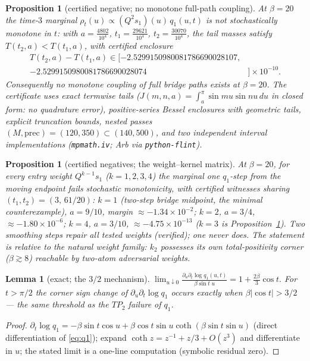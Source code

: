 \documentclass[11pt]{article}
\newtheorem{lemma}[theorem]{Lemma}
\newtheorem{proposition}[theorem]{Proposition}
\theoremstyle{remark}
\newcommand{\dd}{\,d}
\begin{document}
\begin{proposition}[certified negative; no monotone full-path coupling]
\label{prop:coupling}
At $\beta=20$ the time-$3$ marginal
$\rho_t(u)\propto(Q^2s_1)(u)\,q_1(u,t)$ is not stochastically monotone in
$t$: with $a=\tfrac{4802}{10^4}$, $t_1=\tfrac{29621}{10^4}$,
$t_2=\tfrac{30070}{10^4}$, the tail masses satisfy $T(t_2,a)<T(t_1,a)$,
with certified enclosure
\begin{align*}
T(t_2,a)-T(t_1,a)\in
[-2.5299150980081786690028107,&\\
 -2.5299150980081786690028074&]\times10^{-10}.
\end{align*}
Consequently no monotone coupling of full bridge paths exists at
$\beta=20$. The certificate uses exact termwise tails
($J(m,n,a)=\int_a^\pi\sin mu\sin nu\dd u$ in closed form: no quadrature
error), positive-series Bessel enclosures with geometric tails, explicit
truncation bounds, nested passes $(M,\mathrm{prec})=(120,350)\subset
(140,500)$, and two independent interval implementations
(\texttt{mpmath.iv}; Arb via \texttt{python-flint}).
\end{proposition}

\begin{proposition}[certified negatives; the weight--kernel matrix]
\label{prop:matrix}
At $\beta=20$, for every entry weight $Q^{k-1}s_1$ ($k=1,2,3,4$) the
marginal one $q_1$-step from the moving endpoint fails stochastic
monotonicity, with certified witnesses sharing $(t_1,t_2)=(3,\,61/20)$:
$k=1$ (two-step bridge midpoint, the minimal counterexample), $a=9/10$,
margin $\approx-1.34\times10^{-2}$; $k=2$, $a=3/4$,
$\approx-1.80\times10^{-6}$; $k=4$, $a=3/10$,
$\approx-4.75\times10^{-13}$ ($k=3$ is
Proposition~\ref{prop:coupling}). Two smoothing steps repair all tested
weights (verified); one never does. The statement is relative to the
natural weight family: $k_2$ possesses its own total-positivity corner
($\beta\gtrsim8$) reachable by two-atom adversarial weights.
\end{proposition}

\begin{lemma}[exact; the $3/2$ mechanism]\label{lem:mech}
$\displaystyle
\lim_{u\downarrow0}\frac{\partial_u\partial_t\log q_1(u,t)}
{\beta\sin t\;u}=1+\frac{2\beta}{3}\cos t .$
For $t>\pi/2$ the corner sign change of $\partial_u\partial_t\log q_1$
occurs exactly when $\beta|\cos t|>3/2$ --- the same threshold as the
$TP_2$ failure of $q_1$.
\end{lemma}

\begin{proof}
$\partial_t\log q_1=-\beta\sin t\cos u+\beta\cos t\sin u\coth(\beta\sin
t\sin u)$ (direct differentiation of \eqref{eq:q1}); expand
$\coth z=z^{-1}+z/3+O(z^3)$ and differentiate in $u$; the stated limit is
a one-line computation (symbolic residual zero).
\end{proof}
\end{document}
